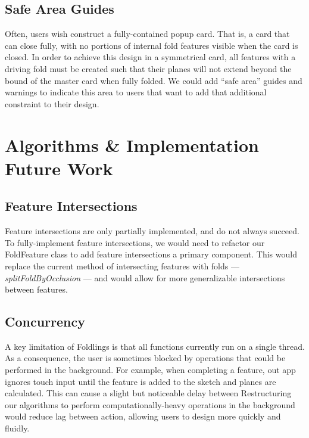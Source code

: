 \subsection{Safe Area Guides}\label{safe-area-guides}

Often, users wish construct a fully-contained popup card. That is, a
card that can close fully, with no portions of internal fold features
visible when the card is closed. In order to achieve this design in a
symmetrical card, all features with a driving fold must be created such
that their planes will not extend beyond the bound of the master card
when fully folded. We could add ``safe area'' guides and warnings to
indicate this area to users that want to add that additional constraint
to their design.

\section{Algorithms \& Implementation Future
Work}\label{algorithms-implementation-future-work}

\subsection{Feature Intersections}\label{feature-intersections}

Feature intersections are only partially implemented, and do not always
succeed. To fully-implement feature intersections, we would need to
refactor our FoldFeature class to add feature intersections a primary
component. This would replace the current method of intersecting
features with folds --- \emph{splitFoldByOcclusion} --- and would allow
for more generalizable intersections between features.

\subsection{Concurrency}\label{concurrency}

A key limitation of Foldlings is that all functions currently run on a
single thread. As a consequence, the user is sometimes blocked by
operations that could be performed in the background. For example, when
completing a feature, out app ignores touch input until the feature is
added to the sketch and planes are calculated. This can cause a slight
but noticeable delay between Restructuring our algorithms to perform
computationally-heavy operations in the background would reduce lag
between action, allowing users to design more quickly and fluidly.
